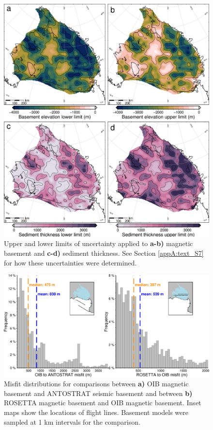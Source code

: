 \begin{figure}[!ht]
    \centering
    \includegraphics[width=.95\textwidth]{figures/chp2/figure_S5.png}
    \caption[Uncertainty limits of basement and sediment thickness]{Upper and lower limits of uncertainty applied to \textbf{a-b)} magnetic basement and \textbf{c-d)} sediment thickness. See Section \ref{appA:text_S7} for how these uncertainties were determined.}
    \label{fig:appA_S5}
\end{figure}

\begin{figure}[!ht]
    \centering
    \includegraphics[width=.95\textwidth]{figures/chp2/figure_S6.png}
    \caption[Misfit distributions between magnetic and seismic basement]{Misfit distributions for comparisons between \textbf{a)} OIB magnetic basement and ANTOSTRAT seismic basement and between \textbf{b)} ROSETTA magnetic basement and OIB magnetic basement. Inset maps show the locations of flight lines. Basement models were sampled at 1 km intervals for the comparison.}
    \label{fig:appA_S6} 
\end{figure}

